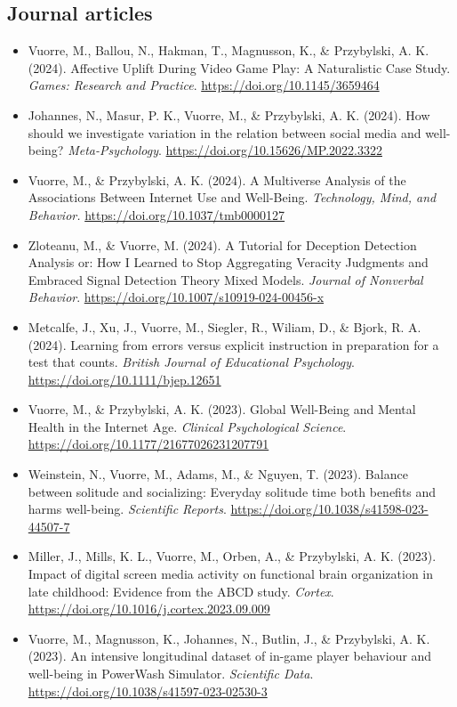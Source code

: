 \documentclass[12pt, a4paper]{article}
\newcommand{\years}[1]{\marginnote{\scriptsize #1}}
\begin{document}
\subsection*{Journal articles}
\begin{itemize}
  \item \years{2024} Vuorre, M., Ballou, N., Hakman, T., Magnusson, K., \& Przybylski, A. K. (2024). Affective Uplift During Video Game Play: A Naturalistic Case Study. \emph{Games: Research and Practice}. \url{https://doi.org/10.1145/3659464}
  \item Johannes, N., Masur, P. K., Vuorre, M., \& Przybylski, A. K. (2024). How should we investigate variation in the relation between social media and well-being? \emph{Meta-Psychology}. \url{https://doi.org/10.15626/MP.2022.3322}
  \item Vuorre, M., \& Przybylski, A. K. (2024). A Multiverse Analysis of the Associations Between Internet Use and Well-Being. \emph{Technology, Mind, and Behavior.} \url{https://doi.org/10.1037/tmb0000127}
  \item Zloteanu, M., \& Vuorre, M. (2024). A Tutorial for Deception Detection Analysis or: How I Learned to Stop Aggregating Veracity Judgments and Embraced Signal Detection Theory Mixed Models. \emph{Journal of Nonverbal Behavior}. \url{https://doi.org/10.1007/s10919-024-00456-x}
  \item Metcalfe, J., Xu, J., Vuorre, M., Siegler, R., Wiliam, D., \& Bjork, R. A. (2024). Learning from errors versus explicit instruction in preparation for a test that counts. \emph{British Journal of Educational Psychology}. \url{https://doi.org/10.1111/bjep.12651}
  \item \years{2023} Vuorre, M., \& Przybylski, A. K. (2023). Global Well-Being and Mental Health in the Internet Age. \emph{Clinical Psychological Science}. \url{https://doi.org/10.1177/21677026231207791}
  \item Weinstein, N., Vuorre, M., Adams, M., \& Nguyen, T. (2023). Balance between solitude and socializing: Everyday solitude time both benefits and harms well-being. \emph{Scientific Reports}. \url{https://doi.org/10.1038/s41598-023-44507-7}
  \item Miller, J., Mills, K. L., Vuorre, M., Orben, A., \& Przybylski, A. K. (2023). Impact of digital screen media activity on functional brain organization in late childhood: Evidence from the ABCD study. \emph{Cortex}. \url{https://doi.org/10.1016/j.cortex.2023.09.009}
  \item Vuorre, M., Magnusson, K., Johannes, N., Butlin, J., \& Przybylski, A. K. (2023). An intensive longitudinal dataset of in-game player behaviour and well-being in PowerWash Simulator. \emph{Scientific Data}. \url{https://doi.org/10.1038/s41597-023-02530-3}

\end{itemize}
\end{document}
